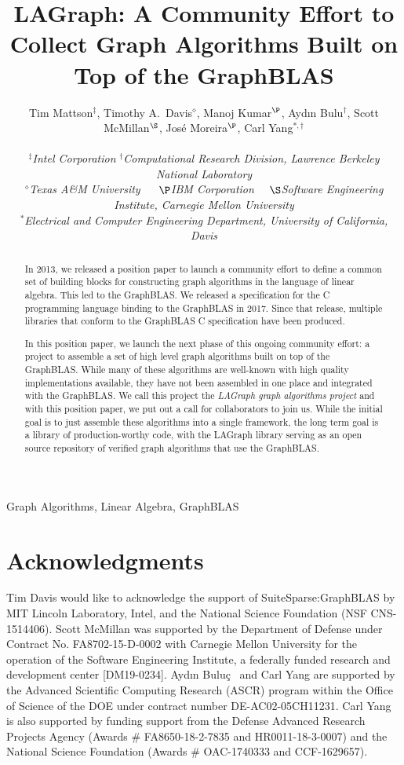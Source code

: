 \documentclass[10pt, conference, compsocconf,letter]{IEEEtran}
\title{LAGraph: A Community Effort to Collect Graph Algorithms Built on Top of the GraphBLAS}
\author{
Tim Mattson$^\ddag$, Timothy A.~Davis$^\diamond$, Manoj Kumar$^\P$, Ayd\i n Bulu\qc$^\dag$, Scott McMillan$^\S$, Jos\'e Moreira$^\P$, Carl Yang$^{*,\dag}$ \\
\\

 \normalsize
 {\em $^\ddag$Intel Corporation}  {\em $^\dag$Computational Research Division, Lawrence Berkeley National Laboratory} \\
{\em $^\diamond$Texas A\&M University} ~~ {\em $\P$IBM Corporation}~~ {\em $\S$Software Engineering Institute, Carnegie Mellon University}   \\
{\em $^*$Electrical and Computer Engineering Department, University of California, Davis}
 }
\newcommand{\qc}{\c{c}}
\begin{document}
\maketitle

\begin{abstract}

In 2013, we released a position paper to launch a community effort to define a 
common set of building blocks for constructing graph algorithms in the language of linear algebra.
This led to the GraphBLAS.   We released a specification for the C programming language binding to the
GraphBLAS in 2017.  Since that release, multiple libraries that conform to the 
GraphBLAS C specification have been produced.

In this position paper, we launch the next phase of this ongoing community effort: a project to
assemble a set of high level graph algorithms built on top of the GraphBLAS.  While many 
of these algorithms are well-known with high quality implementations available,
they have not been assembled in one place and integrated with the GraphBLAS.  We call 
this project the \emph{LAGraph graph algorithms project} and with this position paper, we put out a 
call for collaborators to join us.  While the initial goal is to just assemble
these algorithms into a single framework, the long term goal is a library of production-worthy code,
with the LAGraph library serving as an open source repository of verified graph algorithms that use the
GraphBLAS. 

\end{abstract}

\begin{IEEEkeywords}
Graph Algorithms, Linear Algebra, GraphBLAS
\end{IEEEkeywords}













\section*{Acknowledgments}

Tim Davis would like to acknowledge the support of SuiteSparse:GraphBLAS by MIT
Lincoln Laboratory, Intel, and the National Science Foundation (NSF
CNS-1514406).  Scott McMillan was supported by the Department of 
Defense under Contract No. FA8702-15-D-0002 with Carnegie Mellon 
University for the operation of the Software Engineering Institute, 
a federally funded research and development center [DM19-0234].
Ayd\i n Bulu\qc~ and Carl Yang are supported by the Advanced Scientific Computing Research (ASCR) program within
the Office of Science of the DOE under contract number DE-AC02-05CH11231. Carl Yang is also supported by funding support from the Defense Advanced Research Projects Agency (Awards \# FA8650-18-2-7835 and HR0011-18-3-0007) and the National Science Foundation (Awards \# OAC-1740333 and CCF-1629657).



\end{document}
